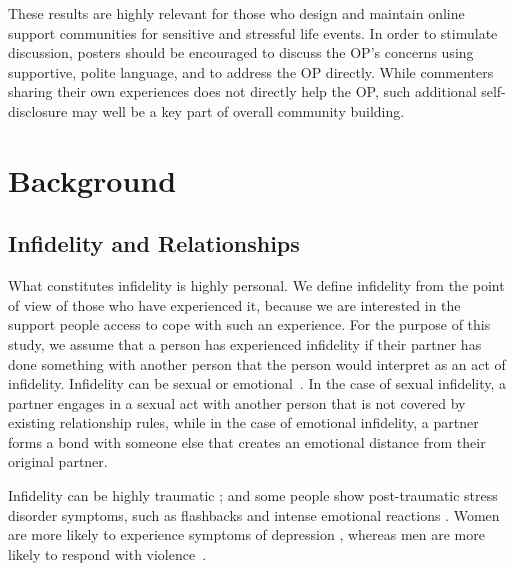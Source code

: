 These results are highly relevant for those who design and maintain online support communities for sensitive and stressful life events. In order to stimulate discussion, posters should be encouraged to discuss the OP's concerns using supportive, polite language, and to address the OP directly. While commenters sharing their own experiences does not directly help the OP, such additional self-disclosure may well be a key part of overall community building. 






\section{Background}

\subsection{Infidelity and Relationships}

What constitutes infidelity is highly personal. We define infidelity from the point of view of those who have experienced it, because we are interested in the support people access to cope with such an experience.  For the purpose of this study, we assume that a person has experienced infidelity if their partner has done something with another person that the person would interpret as an act of infidelity. Infidelity can be sexual or emotional~\cite{Jain2018}. In the case of sexual infidelity, a partner engages in a sexual act with another person that is not covered by existing relationship rules, while in the case of emotional infidelity, a partner forms a bond with someone else that creates an emotional distance from their original partner.

Infidelity can be highly traumatic \cite{snyder2008integrative}; and some people show post-traumatic stress disorder symptoms, such as flashbacks and intense emotional reactions \cite{gordon2008optimal}. Women are more likely to experience symptoms of depression \cite{miller2008coping, blow2005infidelity}, whereas men are  more likely to respond with violence~\cite{christian2001impact}. 

